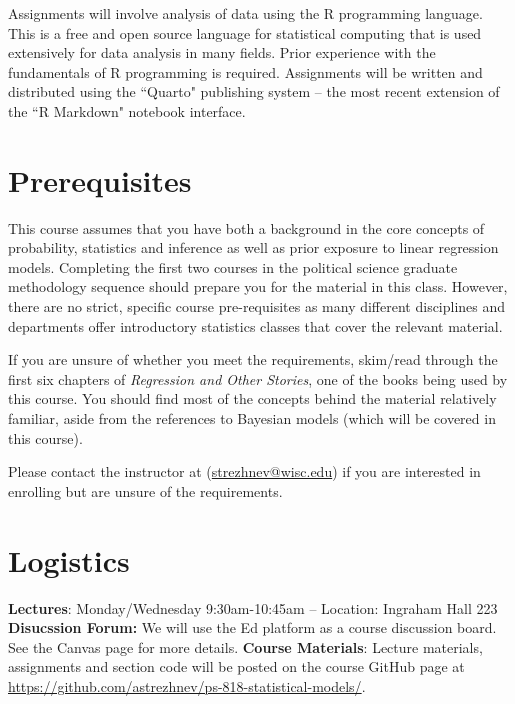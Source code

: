 \documentclass[11pt, article, oneside]{memoir}
\theoremstyle{Assumption}
\begin{document}
Assignments will involve analysis of data using the R programming language. This is a free and open source language for statistical computing that is used extensively for data analysis in many fields. Prior experience with the fundamentals of R programming is required. Assignments will be written and distributed using the ``Quarto" publishing system -- the most recent extension of the ``R Markdown" notebook interface. 

\section*{Prerequisites}

This course assumes that you have both a background in the core concepts of probability, statistics and inference as well as prior exposure to linear regression models. Completing the first two courses in the political science graduate methodology sequence should prepare you for the material in this class. However, there are no strict, specific course pre-requisites as many different disciplines and departments offer introductory statistics classes that cover the relevant material.

If you are unsure of whether you meet the requirements, skim/read through the first six chapters of \textit{Regression and Other Stories}, one of the books being used by this course. You should find most of the concepts behind the material relatively familiar, aside from the references to Bayesian models (which will be covered in this course).

Please contact the instructor at (\href{mailto:strezhnev@wisc.edu}{strezhnev@wisc.edu}) if you are interested in enrolling but are unsure of the requirements. 

\section*{Logistics}

\textbf{Lectures}: Monday/Wednesday  9:30am-10:45am -- Location: Ingraham Hall 223
\newline\newline \textbf{Disucssion Forum:} We will use the Ed platform as a course discussion board. See the Canvas page for more details.
\newline\newline\textbf{Course Materials}: Lecture materials, assignments and section code will be posted on the course GitHub page at \url{https://github.com/astrezhnev/ps-818-statistical-models/}.
\end{document}
